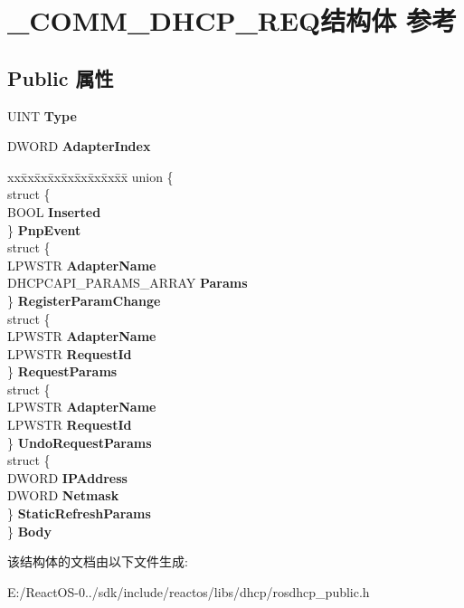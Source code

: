 \hypertarget{struct___c_o_m_m___d_h_c_p___r_e_q}{}\section{\+\_\+\+C\+O\+M\+M\+\_\+\+D\+H\+C\+P\+\_\+\+R\+E\+Q结构体 参考}
\label{struct___c_o_m_m___d_h_c_p___r_e_q}
\subsection*{Public 属性}
\begin{DoxyCompactItemize}
\item 
\mbox{\label{struct___c_o_m_m___d_h_c_p___r_e_q_af8ae7805f3ce917307a86a060334c9a0}} 
U\+I\+NT {\bfseries Type}
\item 
\mbox{\label{struct___c_o_m_m___d_h_c_p___r_e_q_a0ad2e4ca70f2e2c3b79807c348c21037}} 
D\+W\+O\+RD {\bfseries Adapter\+Index}
\item 
\mbox{\label{struct___c_o_m_m___d_h_c_p___r_e_q_a3383949f1b1e3839d056ad16d5c85c80}} 
\begin{tabbing}
xx\=xx\=xx\=xx\=xx\=xx\=xx\=xx\=xx\=\kill
union \{\\
\>struct \{\\
\>\>BOOL {\bfseries Inserted}\\
\>\} {\bfseries PnpEvent}\\
\>struct \{\\
\>\>LPWSTR {\bfseries AdapterName}\\
\>\>DHCPCAPI\_PARAMS\_ARRAY {\bfseries Params}\\
\>\} {\bfseries RegisterParamChange}\\
\>struct \{\\
\>\>LPWSTR {\bfseries AdapterName}\\
\>\>LPWSTR {\bfseries RequestId}\\
\>\} {\bfseries RequestParams}\\
\>struct \{\\
\>\>LPWSTR {\bfseries AdapterName}\\
\>\>LPWSTR {\bfseries RequestId}\\
\>\} {\bfseries UndoRequestParams}\\
\>struct \{\\
\>\>DWORD {\bfseries IPAddress}\\
\>\>DWORD {\bfseries Netmask}\\
\>\} {\bfseries StaticRefreshParams}\\
\} {\bfseries Body}\\

\end{tabbing}\end{DoxyCompactItemize}


该结构体的文档由以下文件生成\+:\begin{DoxyCompactItemize}
\item 
E\+:/\+React\+O\+S-\/0../sdk/include/reactos/libs/dhcp/rosdhcp\+\_\+public.\+h\end{DoxyCompactItemize}
